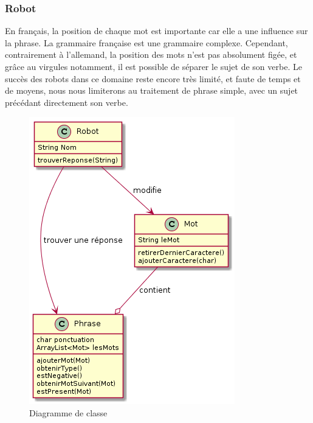 \subsubsection{Robot}
En français, la position de chaque mot est importante car elle a une influence sur la phrase. La grammaire française est une grammaire complexe. Cependant, contrairement à l'allemand, la position des mots n'est pas absolument figée, et grâce au virgules notamment, il est possible de séparer le sujet de son verbe. Le succès des robots dans ce domaine reste encore très limité, et faute de temps et de moyens, nous nous limiterons au traitement de phrase simple, avec un sujet précédant directement son verbe.

\begin{figure}
    \center
	\includegraphics[scale=0.5]{diagrammeDeClasse.png}
	\caption{Diagramme de classe}
\end{figure}
